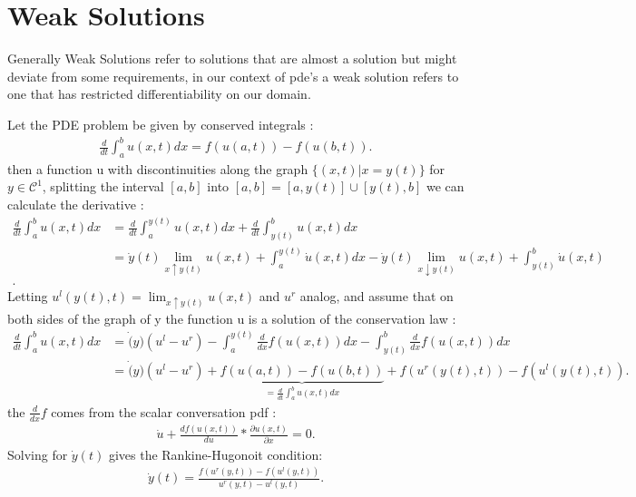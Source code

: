 \section{Weak Solutions}
Generally Weak Solutions refer to solutions that are almost a solution but might deviate from some requirements,
in our context of pde's a weak solution refers to one that has restricted differentiability on our domain.
\begin{definition}
  Let the PDE problem be given by conserved integrals : 
  \begin{align*}
    \frac{d}{dt} \int_a^b u(x,t) dx = f(u(a,t)) - f(u(b,t))
  .\end{align*}
  then a function u with discontinuities along the graph $\{(x,t) | x=y(t)\}  $ for $y \in  \mathcal{C}^1$,
  splitting the interval $[a,b]$ into $[a,b] = [a,y(t)] \cup [y(t),b]$ we can calculate the derivative : 
  \begin{align*}
    \frac{d}{dt} \int_{a}^b u(x,t) dx &= \frac{d}{dt} \int_a^{y(t)} u(x,t) dx + \frac{d}{dt} \int_{y(t)}^b u(x,t) dx \\
                                      &= \dot{y}(t) \lim_{x \uparrow y(t)} u(x,t) + \int_a^{y(t)} \dot{u}(x,t) dx - \dot{y}(t) \lim_{x \downarrow y(t)} u(x,t) + \int_{y(t)}^{b} \dot{u}(x,t)\\
  .\end{align*}
  Letting $u^l(y(t),t) = \lim_{x \uparrow y(t)} u(x,t)$ and $u^r$ analog, and assume that on both sides of the graph of y the function u is a solution of the conservation law : 
  \begin{align*}
    \frac{d}{dt} \int_{a}^b u(x,t) dx &= \dot(y)(u^l - u^r) - \int_{a}^{y(t)} \frac{d}{dx} f(u(x,t)) dx - \int_{y(t)}^b \frac{d}{dx} f(u(x,t)) dx \\
                                      &=  \dot(y)(u^l - u^r) + \underbrace{f(u(a,t)) - f(u(b,t))}_{= \frac{d}{dt} \int_a^b u(x,t) dx} +f(u^{r} (y(t),t)) - f(u^{l}(y(t),t))
  .\end{align*}
  the $\frac{d}{dx} f$ comes from the scalar conversation pdf : 
  \begin{align*}
    \dot{u} + \frac{df(u(x,t))}{du}* \frac{\partial u(x,t)}{\partial x}  = 0
  .\end{align*}
  Solving for $\dot{y}(t)$ gives the Rankine-Hugonoit condition: 
  \begin{align*}
    \dot{y}(t) = \frac{f(u^{r}(y,t))-f(u^{l}(y,t) )}{u^{r}(y,t)- u^{l}(y,t)}
  .\end{align*}
\end{definition}
